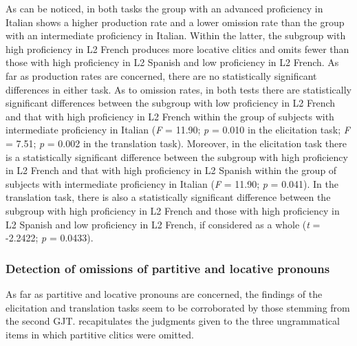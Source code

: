 \documentclass[output=paper,modfonts,nonflat,newtxmath]{langsci/langscibook}
\begin{document}
As can be noticed, in both tasks the group with an advanced proficiency in Italian shows a higher production rate and a lower omission rate than the group with an intermediate proficiency in Italian. Within the latter, the subgroup with high proficiency in L2 French produces more locative clitics and omits fewer than those with high proficiency in L2 Spanish and low proficiency in L2 French. As far as production rates are concerned, there are no statistically significant differences in either task. As to omission rates, in both tests there are statistically significant differences between the subgroup with low proficiency in L2 French and that with high proficiency in L2 French within the group of subjects with intermediate proficiency in Italian (\textit{F} = 11.90; \textit{p} = 0.010 in the elicitation task; \textit{F} = 7.51; \textit{p} = 0.002 in the translation task). Moreover, in the elicitation task there is a statistically significant difference between the subgroup with high proficiency in L2 French and that with high proficiency in L2 Spanish within the group of subjects with intermediate proficiency in Italian (\textit{F} = 11.90; \textit{p} = 0.041). In the translation task, there is also a statistically significant difference between the subgroup with high proficiency in L2 French and those with high proficiency in L2 Spanish and low proficiency in L2 French, if considered as a whole (\textit{t} = -2.2422; \textit{p} = 0.0433).

\subsubsection{Detection {of} {omissions} {of} {partitive} {and} {locative} pronouns} %

As far as partitive and locative pronouns are concerned, the findings of the elicitation and translation tasks seem to be corroborated by those stemming from the second GJT.  recapitulates the judgments given to the three ungrammatical items in which partitive clitics were omitted.
\end{document}
